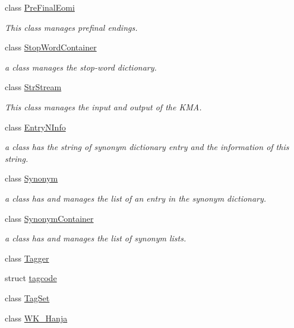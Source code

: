 \begin{CompactItemize}
class \hyperlink{classkmaOrange_1_1PreFinalEomi}{PreFinalEomi}
\begin{CompactList}\small\item\em This class manages prefinal endings. \item\end{CompactList}\item 
class \hyperlink{classkmaOrange_1_1StopWordContainer}{StopWordContainer}
\begin{CompactList}\small\item\em a class manages the stop-word dictionary. \item\end{CompactList}\item 
class \hyperlink{classkmaOrange_1_1StrStream}{StrStream}
\begin{CompactList}\small\item\em This class manages the input and output of the KMA. \item\end{CompactList}\item 
class \hyperlink{classkmaOrange_1_1EntryNInfo}{EntryNInfo}
\begin{CompactList}\small\item\em a class has the string of synonym dictionary entry and the information of this string. \item\end{CompactList}\item 
class \hyperlink{classkmaOrange_1_1Synonym}{Synonym}
\begin{CompactList}\small\item\em a class has and manages the list of an entry in the synonym dictionary. \item\end{CompactList}\item 
class \hyperlink{classkmaOrange_1_1SynonymContainer}{SynonymContainer}
\begin{CompactList}\small\item\em a class has and manages the list of synonym lists. \item\end{CompactList}\item 
class \hyperlink{classkmaOrange_1_1Tagger}{Tagger}
\item 
struct \hyperlink{structkmaOrange_1_1tagcode}{tagcode}
\item 
class \hyperlink{classkmaOrange_1_1TagSet}{TagSet}
\item 
class \hyperlink{classkmaOrange_1_1WK__Hanja}{WK\_\-Hanja}
\end{CompactItemize}
